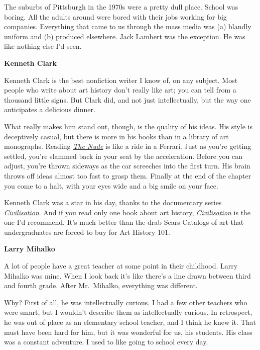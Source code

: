 The suburbs of Pittsburgh in the 1970s were a pretty dull place. School
was boring. All the adults around were bored with their jobs working for
big companies. Everything that came to us through the mass media was (a)
blandly uniform and (b) produced elsewhere. Jack Lambert was the
exception. He was like nothing else I'd seen.

\textbf{Kenneth Clark}

Kenneth Clark is the best nonfiction writer I know of, on any subject.
Most people who write about art history don't really like art; you can
tell from a thousand little signs. But Clark did, and not just
intellectually, but the way one anticipates a delicious dinner.

What really makes him stand out, though, is the quality of his ideas.
His style is deceptively casual, but there is more in his books than in
a library of art monographs. Reading
\href{http://www.amazon.com/Nude-Study-Ideal-Form/dp/0691017883}{\emph{The
Nude}} is like a ride in a Ferrari. Just as you're getting settled,
you're slammed back in your seat by the acceleration. Before you can
adjust, you're thrown sideways as the car screeches into the first turn.
His brain throws off ideas almost too fast to grasp them. Finally at the
end of the chapter you come to a halt, with your eyes wide and a big
smile on your face.

Kenneth Clark was a star in his day, thanks to the documentary series
\href{http://www.amazon.com/dp/B000F0UUKA}{\emph{Civilisation}}. And if
you read only one book about art history,
\href{http://www.abebooks.com/servlet/SearchResults?an=clark&sts=t&tn=civilisation}{\emph{Civilisation}}
is the one I'd recommend. It's much better than the drab Sears Catalogs
of art that undergraduates are forced to buy for Art History 101.

\textbf{Larry Mihalko}

A lot of people have a great teacher at some point in their childhood.
Larry Mihalko was mine. When I look back it's like there's a line drawn
between third and fourth grade. After Mr.~Mihalko, everything was
different.

Why? First of all, he was intellectually curious. I had a few other
teachers who were smart, but I wouldn't describe them as intellectually
curious. In retrospect, he was out of place as an elementary school
teacher, and I think he knew it. That must have been hard for him, but
it was wonderful for us, his students. His class was a constant
adventure. I used to like going to school every day.

